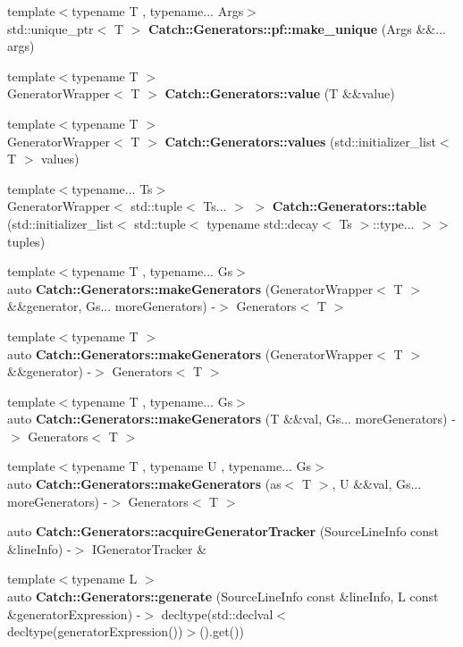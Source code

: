 \begin{DoxyCompactItemize}
\item 
{\footnotesize template$<$typename T , typename... Args$>$ }\\std\+::unique\+\_\+ptr$<$ T $>$ \textbf{ Catch\+::\+Generators\+::pf\+::make\+\_\+unique} (Args \&\&... args)
\item 
{\footnotesize template$<$typename T $>$ }\\Generator\+Wrapper$<$ T $>$ \textbf{ Catch\+::\+Generators\+::value} (T \&\&value)
\item 
{\footnotesize template$<$typename T $>$ }\\Generator\+Wrapper$<$ T $>$ \textbf{ Catch\+::\+Generators\+::values} (std\+::initializer\+\_\+list$<$ T $>$ values)
\item 
{\footnotesize template$<$typename... Ts$>$ }\\Generator\+Wrapper$<$ std\+::tuple$<$ Ts... $>$ $>$ \textbf{ Catch\+::\+Generators\+::table} (std\+::initializer\+\_\+list$<$ std\+::tuple$<$ typename std\+::decay$<$ Ts $>$\+::type... $>$$>$ tuples)
\item 
{\footnotesize template$<$typename T , typename... Gs$>$ }\\auto \textbf{ Catch\+::\+Generators\+::make\+Generators} (Generator\+Wrapper$<$ T $>$ \&\&generator, Gs... more\+Generators) -\/$>$ Generators$<$ T $>$
\item 
{\footnotesize template$<$typename T $>$ }\\auto \textbf{ Catch\+::\+Generators\+::make\+Generators} (Generator\+Wrapper$<$ T $>$ \&\&generator) -\/$>$ Generators$<$ T $>$
\item 
{\footnotesize template$<$typename T , typename... Gs$>$ }\\auto \textbf{ Catch\+::\+Generators\+::make\+Generators} (T \&\&val, Gs... more\+Generators) -\/$>$ Generators$<$ T $>$
\item 
{\footnotesize template$<$typename T , typename U , typename... Gs$>$ }\\auto \textbf{ Catch\+::\+Generators\+::make\+Generators} (as$<$ T $>$, U \&\&val, Gs... more\+Generators) -\/$>$ Generators$<$ T $>$
\item 
auto \textbf{ Catch\+::\+Generators\+::acquire\+Generator\+Tracker} (Source\+Line\+Info const \&line\+Info) -\/$>$ I\+Generator\+Tracker \&
\item 
{\footnotesize template$<$typename L $>$ }\\auto \textbf{ Catch\+::\+Generators\+::generate} (Source\+Line\+Info const \&line\+Info, L const \&generator\+Expression) -\/$>$ decltype(std\+::declval$<$ decltype(generator\+Expression())$>$().get())
$$
\end{DoxyCompactItemize}

